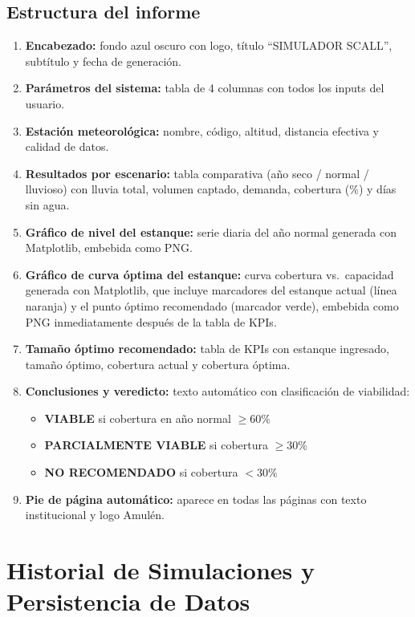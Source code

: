 \documentclass[12pt, a4paper]{article}
\begin{document}
\subsection{Estructura del informe}

\begin{enumerate}
    \item \textbf{Encabezado:} fondo azul oscuro con logo, título ``SIMULADOR SCALL'', subtítulo y fecha de generación.
    \item \textbf{Parámetros del sistema:} tabla de 4 columnas con todos los inputs del usuario.
    \item \textbf{Estación meteorológica:} nombre, código, altitud, distancia efectiva y calidad de datos.
    \item \textbf{Resultados por escenario:} tabla comparativa (año seco / normal / lluvioso) con lluvia total, volumen captado, demanda, cobertura (\%) y días sin agua.
    \item \textbf{Gráfico de nivel del estanque:} serie diaria del año normal generada con Matplotlib, embebida como PNG.
    \item \textbf{Gráfico de curva óptima del estanque:} curva cobertura vs.\ capacidad generada con Matplotlib, que incluye marcadores del estanque actual (línea naranja) y el punto óptimo recomendado (marcador verde), embebida como PNG inmediatamente después de la tabla de KPIs.
    \item \textbf{Tamaño óptimo recomendado:} tabla de KPIs con estanque ingresado, tamaño óptimo, cobertura actual y cobertura óptima.
    \item \textbf{Conclusiones y veredicto:} texto automático con clasificación de viabilidad:
    \begin{itemize}
        \item \textbf{VIABLE} si cobertura en año normal $\geq 60\%$
        \item \textbf{PARCIALMENTE VIABLE} si cobertura $\geq 30\%$
        \item \textbf{NO RECOMENDADO} si cobertura $< 30\%$
    \end{itemize}
    \item \textbf{Pie de página automático:} aparece en todas las páginas con texto institucional y logo Amulén.
\end{enumerate}

\section{Historial de Simulaciones y Persistencia de Datos}
\label{sec:historial}
\end{document}
